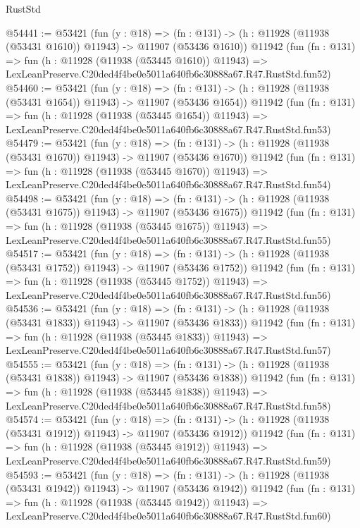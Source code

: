 \begin{lexlean}{RustStd}
\begin{coremodule}
@54441 := @53421
    (fun (y : @18) =>
    (fn : @131) -> (h : @11928 (@11938 (@53431 @1610)) @11943) -> @11907 (@53436 @1610))
    @11942
    (fun (fn : @131) =>
    fun (h : @11928 (@11938 (@53445 @1610)) @11943) =>
    LexLeanPreserve.C20ded4f4be0e5011a640fb6c30888a67.R47.RustStd.fun52)
@54460 := @53421
    (fun (y : @18) =>
    (fn : @131) -> (h : @11928 (@11938 (@53431 @1654)) @11943) -> @11907 (@53436 @1654))
    @11942
    (fun (fn : @131) =>
    fun (h : @11928 (@11938 (@53445 @1654)) @11943) =>
    LexLeanPreserve.C20ded4f4be0e5011a640fb6c30888a67.R47.RustStd.fun53)
@54479 := @53421
    (fun (y : @18) =>
    (fn : @131) -> (h : @11928 (@11938 (@53431 @1670)) @11943) -> @11907 (@53436 @1670))
    @11942
    (fun (fn : @131) =>
    fun (h : @11928 (@11938 (@53445 @1670)) @11943) =>
    LexLeanPreserve.C20ded4f4be0e5011a640fb6c30888a67.R47.RustStd.fun54)
@54498 := @53421
    (fun (y : @18) =>
    (fn : @131) -> (h : @11928 (@11938 (@53431 @1675)) @11943) -> @11907 (@53436 @1675))
    @11942
    (fun (fn : @131) =>
    fun (h : @11928 (@11938 (@53445 @1675)) @11943) =>
    LexLeanPreserve.C20ded4f4be0e5011a640fb6c30888a67.R47.RustStd.fun55)
@54517 := @53421
    (fun (y : @18) =>
    (fn : @131) -> (h : @11928 (@11938 (@53431 @1752)) @11943) -> @11907 (@53436 @1752))
    @11942
    (fun (fn : @131) =>
    fun (h : @11928 (@11938 (@53445 @1752)) @11943) =>
    LexLeanPreserve.C20ded4f4be0e5011a640fb6c30888a67.R47.RustStd.fun56)
@54536 := @53421
    (fun (y : @18) =>
    (fn : @131) -> (h : @11928 (@11938 (@53431 @1833)) @11943) -> @11907 (@53436 @1833))
    @11942
    (fun (fn : @131) =>
    fun (h : @11928 (@11938 (@53445 @1833)) @11943) =>
    LexLeanPreserve.C20ded4f4be0e5011a640fb6c30888a67.R47.RustStd.fun57)
@54555 := @53421
    (fun (y : @18) =>
    (fn : @131) -> (h : @11928 (@11938 (@53431 @1838)) @11943) -> @11907 (@53436 @1838))
    @11942
    (fun (fn : @131) =>
    fun (h : @11928 (@11938 (@53445 @1838)) @11943) =>
    LexLeanPreserve.C20ded4f4be0e5011a640fb6c30888a67.R47.RustStd.fun58)
@54574 := @53421
    (fun (y : @18) =>
    (fn : @131) -> (h : @11928 (@11938 (@53431 @1912)) @11943) -> @11907 (@53436 @1912))
    @11942
    (fun (fn : @131) =>
    fun (h : @11928 (@11938 (@53445 @1912)) @11943) =>
    LexLeanPreserve.C20ded4f4be0e5011a640fb6c30888a67.R47.RustStd.fun59)
@54593 := @53421
    (fun (y : @18) =>
    (fn : @131) -> (h : @11928 (@11938 (@53431 @1942)) @11943) -> @11907 (@53436 @1942))
    @11942
    (fun (fn : @131) =>
    fun (h : @11928 (@11938 (@53445 @1942)) @11943) =>
    LexLeanPreserve.C20ded4f4be0e5011a640fb6c30888a67.R47.RustStd.fun60)

\end{coremodule}
\end{lexlean}
